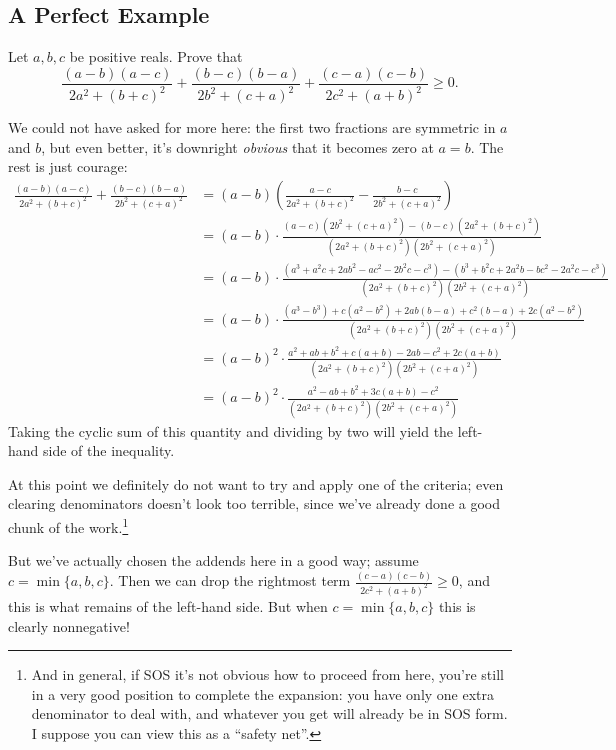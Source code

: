 \documentclass{scrartcl}
\begin{document}
\subsection{A Perfect Example}
\begin{example}
  Let $a,b,c$ be positive reals. Prove that
  \[ \frac{(a-b)(a-c)}{2a^2 + (b+c)^2} + \frac{(b-c)(b-a)}{2b^2 + (c+a)^2} + \frac{(c-a)(c-b)}{2c^2 + (a+b)^2} \geq 0. \]
\end{example}
\begin{soln}
  We could not have asked for more here: the first two fractions are symmetric in $a$ and $b$,
  but even better, it's downright \textit{obvious} that it becomes zero at $a=b$.
  The rest is just courage:
  \begin{align*}
    \frac{(a-b)(a-c)}{2a^2+(b+c)^2} + \frac{(b-c)(b-a)}{2b^2+(c+a)^2}
    &= (a-b) \left( \frac{a-c}{2a^2+(b+c)^2} - \frac{b-c}{2b^2 +(c+a)^2} \right) \\
    &= (a-b) \cdot \frac{(a-c)(2b^2+(c+a)^2) - (b-c)(2a^2+(b+c)^2)}{(2a^2+(b+c)^2)(2b^2+(c+a)^2)} \\
    &= (a-b) \cdot \scriptstyle\frac{\left( a^3+a^2c+2ab^2-ac^2-2b^2c-c^3 \right) - \left( b^3+b^2c+2a^2b-bc^2-2a^2c-c^3 \right)}{(2a^2+(b+c)^2)(2b^2+(c+a)^2)} \\
    &= (a-b) \cdot \textstyle\frac{(a^3-b^3) + c(a^2-b^2) + 2ab(b-a) + c^2(b-a) + 2c(a^2-b^2)}{(2a^2+(b+c)^2)(2b^2+(c+a)^2)} \\
    &= (a-b)^2 \cdot \frac{a^2+ab+b^2 + c(a+b) -2ab - c^2 + 2c(a+b)}{(2a^2+(b+c)^2) (2b^2+(c+a)^2)} \\
    &= (a-b)^2 \cdot \frac{a^2-ab+b^2 + 3c(a+b)-c^2}{(2a^2+(b+c)^2) (2b^2+(c+a)^2)}
  \end{align*}
  Taking the cyclic sum of this quantity and dividing by two will yield
  the left-hand side of the inequality.

  At this point we definitely do not want to try and apply one of the criteria;
  even clearing denominators doesn't look too terrible,
  since we've already done a good chunk of the work.\footnote{And in general,
    if SOS it's not obvious how to proceed from here,
    you're still in a very good position to complete the expansion:
    you have only one extra denominator to deal with, and whatever you get will already be in SOS form.
    I suppose you can view this as a ``safety net''.}

  But we've actually chosen the addends here in a good way; assume $c = \min \{a,b,c\}$.
  Then we can drop the rightmost term $\frac{(c-a)(c-b)}{2c^2+(a+b)^2} \ge 0$,
  and this is what remains of the left-hand side.
  But when $c = \min \{a,b,c\}$ this is clearly nonnegative!
\end{soln}
\end{document}
